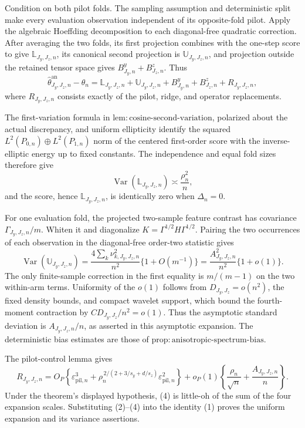 Condition on both pilot folds.  The sampling assumption and deterministic split make every evaluation observation independent of its opposite-fold pilot.  Apply the algebraic Hoeffding decomposition to each diagonal-free quadratic correction.  After averaging the two folds, its first projection combines with the one-step score to give \(\mathbb L_{J_y,J_z,n}\), its canonical second projection is \(\mathbb U_{J_y,J_z,n}\), and projection outside the retained tensor space gives \(B^y_{J_y,n}+B^z_{J_z,n}\).  Thus
\[
\widehat\theta^{\mathrm{an}}_{J_y,J_z,n}-\theta_n
=\mathbb L_{J_y,J_z,n}+\mathbb U_{J_y,J_z,n}
+B^y_{J_y,n}+B^z_{J_z,n}+R_{J_y,J_z,n},                                  \tag{1}
\]
where \(R_{J_y,J_z,n}\) consists exactly of the pilot, ridge, and operator replacements.

The first-variation formula in \(\mathrm{lem{:}cosine\text{-}second\text{-}variation}\), polarized about the actual discrepancy, and uniform ellipticity identify the squared \(L^2(P_{0,n})\oplus L^2(P_{1,n})\) norm of the centered first-order score with the inverse-elliptic energy up to fixed constants.  The independence and equal fold sizes therefore give
\[
\operatorname{Var}(\mathbb L_{J_y,J_z,n})\asymp\frac{\rho_n^2}{n},         \tag{2}
\]
and the score, hence \(\mathbb L_{J_y,J_z,n}\), is identically zero when \(\Delta_n=0\).

For one evaluation fold, the projected two-sample feature contrast has covariance \(\Gamma_{J_y,J_z,n}/m\).  Whiten it and diagonalize \(K=\Gamma^{1/2}H\Gamma^{1/2}\).  Pairing the two occurrences of each observation in the diagonal-free order-two statistic gives
\[
\operatorname{Var}(\mathbb U_{J_y,J_z,n})
=\frac{4\sum_k\nu_{k,J_y,J_z,n}^2}{n^2}\{1+O(m^{-1})\}
=\frac{A_{J_y,J_z,n}^2}{n^2}\{1+o(1)\}.                                 \tag{3}
\]
The only finite-sample correction in the first equality is \(m/(m-1)\) on the two within-arm terms.  Uniformity of the \(o(1)\) follows from \(D_{J_y,J_z}=o(n^2)\), the fixed density bounds, and compact wavelet support, which bound the fourth-moment contraction by \(CD_{J_y,J_z}/n^2=o(1)\).  Thus the asymptotic standard deviation is \(A_{J_y,J_z,n}/n\), as asserted in this asymptotic expansion.  The deterministic bias estimates are those of \(\mathrm{prop{:}anisotropic\text{-}spectrum\text{-}bias}\).

The pilot-control lemma gives
\[
R_{J_y,J_z,n}
=O_P\!\left\{\varepsilon_{\mathrm{pil},n}^3
+\rho_n^{\,2/(2+3/s_y+d/s_z)}\varepsilon_{\mathrm{pil},n}^2\right\}
+o_P(1)\left\{\frac{\rho_n}{\sqrt n}+\frac{A_{J_y,J_z,n}}n\right\}.      \tag{4}
\]
Under the theorem's displayed hypothesis, (4) is little-oh of the sum of the four expansion scales.  Substituting (2)--(4) into the identity (1) proves the uniform expansion and its variance assertions.

